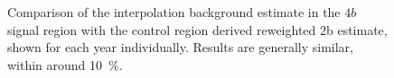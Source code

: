 \begin{figure}
\centering

	\caption{\label{fig:flow-gp-rw-4b} Comparison of the interpolation background estimate in the 
	$4b$ signal region with the control region derived reweighted 2b estimate, shown for each year 
	individually. Results are generally similar, within around 10~\%.}
\end{figure}


